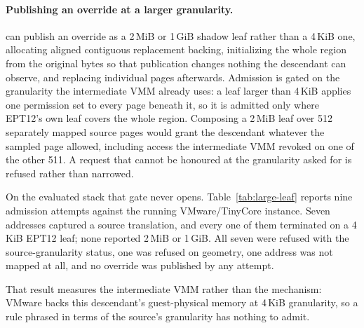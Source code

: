 \paragraph{Publishing an override at a larger granularity.}
\ks{} can publish an override as a 2\,MiB or 1\,GiB shadow leaf rather than a
4\,KiB one, allocating aligned contiguous replacement backing, initializing the
whole region from the original bytes so that publication changes nothing the
descendant can observe, and replacing individual pages afterwards. Admission is
gated on the granularity the intermediate VMM already uses: a leaf larger than
4\,KiB applies one permission set to every page beneath it, so it is admitted
only where EPT12's own leaf covers the whole region. Composing a 2\,MiB leaf over
512 separately mapped source pages would grant the descendant whatever the
sampled page allowed, including access the intermediate VMM revoked on one of the
other 511. A request that cannot be honoured at the granularity asked for is
refused rather than narrowed.

On the evaluated stack that gate never opens. Table~\ref{tab:large-leaf} reports
nine admission attempts against the running VMware/TinyCore instance. Seven
addresses captured a source translation, and every one of them terminated on a
4\,KiB EPT12 leaf; none reported 2\,MiB or 1\,GiB. All seven were refused with
the source-granularity status, one was refused on geometry, one address was not
mapped at all, and no override was published by any attempt.

\begin{table}[tbp]
\centering\small
\caption{Large-leaf admission attempts against the live descendant. Requested and
source shifts are base-two exponents: 12, 21 and 30 are 4\,KiB, 2\,MiB and
1\,GiB. No attempt published an override.}
\label{tab:large-leaf}

\end{table}

That result measures the intermediate VMM rather than the mechanism: VMware backs
this descendant's guest-physical memory at 4\,KiB granularity, so a rule phrased
in terms of the source's granularity has nothing to admit.

